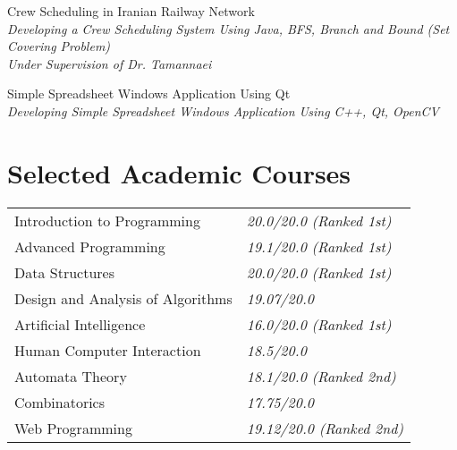 \documentclass[a4paper,10pt]{article}
\begin{document}
		\textbullet\textnormal{ Crew Scheduling in Iranian Railway Network} \\
		\emph{\color{darkgray}\small {\space\space\space}Developing a Crew Scheduling System Using Java, BFS, Branch and Bound (Set Covering Problem) }\\
		\emph{\color{darkgray}\small {\space\space\space}Under Supervision of Dr. Tamannaei} \vspace{1 mm}
		
		\textbullet\textnormal{ Simple Spreadsheet Windows Application Using Qt} \\
		\emph{\color{darkgray}\small {\space\space\space}Developing Simple Spreadsheet Windows Application Using C++, Qt, OpenCV} \vspace{1 mm}
	\section{Selected Academic Courses}
		\begin{tabular}{ll}
			Introduction to Programming & \emph{\color{darkgray}20.0/20.0 (Ranked 1st)} \\
			
			Advanced Programming & \emph{\color{darkgray}19.1/20.0 (Ranked 1st)}\\
			
			Data Structures & \emph{\color{darkgray}20.0/20.0 (Ranked 1st)} \\
			
			Design and Analysis of Algorithms & \emph{\color{darkgray}19.07/20.0}\\
			
			Artificial Intelligence & \emph{\color{darkgray}16.0/20.0 (Ranked 1st)} \\
			
			Human Computer Interaction & \emph{\color{darkgray}18.5/20.0}\\
			
			Automata Theory & \emph{\color{darkgray}18.1/20.0 (Ranked 2nd)}\\
			
			Combinatorics & \emph{\color{darkgray}17.75/20.0}\\
			
			Web Programming & \emph{\color{darkgray}19.12/20.0 (Ranked 2nd)}
		\end{tabular}
\end{document}
